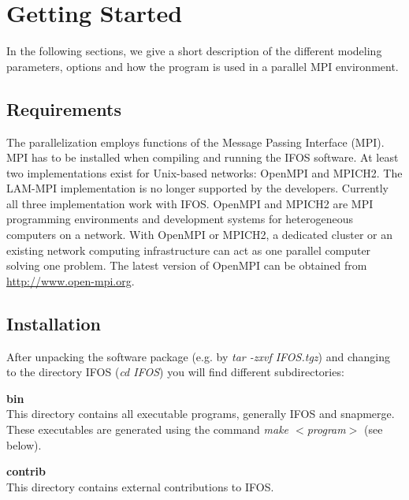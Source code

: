 
\chapter{\label{cha:Getting-Started}Getting Started}


In the following sections, we give a short description of the different modeling  parameters, options and how the program is used in a parallel MPI environment.

\section{Requirements}
The parallelization employs functions of the Message Passing Interface (MPI). MPI has to be installed when compiling and running the IFOS software. At least two implementations exist for Unix-based networks: OpenMPI and MPICH2. The LAM-MPI implementation is no longer supported by the developers. Currently all three implementation work with IFOS. OpenMPI and MPICH2 are MPI programming environments and development systems for heterogeneous computers on a network. With OpenMPI or MPICH2, a dedicated cluster or an existing network computing  infrastructure can act as one parallel computer solving one problem. The latest version of OpenMPI can be obtained from \href{http://www.open-mpi.org}{http://www.open-mpi.org}.%


\section{Installation}
\label{installation}
After unpacking the software package (e.g. by \textit{tar -zxvf IFOS.tgz}) and changing to the directory IFOS (\textit{cd IFOS})  you will find different subdirectories:

\textbf{bin}\\
This directory contains all executable programs, generally IFOS and snapmerge. These executables are generated using the command \textit{make $<$program$>$} (see below).

\textbf{contrib}\\
This directory contains external contributions to IFOS.

